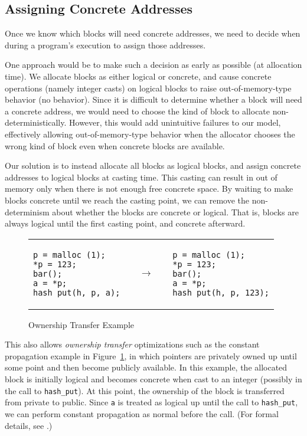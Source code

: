 \subsection{Assigning Concrete Addresses}
\label{idea:ownership}

Once we know which blocks will need concrete addresses, we need to
decide when during a program's execution to assign those addresses.

One approach would be to make such a decision as early as possible
(\ie at allocation time). We allocate blocks as either logical or
concrete, and cause concrete operations (namely integer casts) on
logical blocks to raise out-of-memory-type behavior (\ie no behavior).
Since it is difficult to determine whether a block will need a
concrete address,
we would need to choose the kind of block to allocate
non-deterministically. However, this would add unintuitive failures to
our model, effectively allowing out-of-memory-type behavior when the
allocator chooses the wrong kind of block even when concrete blocks
are available.

Our solution is to instead allocate all blocks as logical blocks, and assign concrete addresses to logical blocks at casting time. This casting can result in out of memory only when there is not enough free concrete space. By waiting to make blocks concrete until we reach the casting point,
we can remove the non-determinism about whether the blocks are
concrete or logical. That is, blocks are always logical until the
first casting point, and concrete afterward.

\begin{figure}[t]
\center
\begin{tabular}{lll}
\begin{lstlisting}
p = malloc (1);
*p = 123;
bar();
a = *p;
hash_put(h, p, a);
\end{lstlisting}
&
$\quad\rightarrow\quad$
&
\begin{lstlisting}
p = malloc (1);
*p = 123;
bar();
a = *p;
hash_put(h, p, 123);
\end{lstlisting}
\end{tabular}
\caption{Ownership Transfer Example}\label{code:ownership}
\end{figure}

This also allows \emph{ownership transfer} optimizations such as the
constant propagation example in Figure~\ref{code:ownership}, in which
pointers are privately owned up until some point and then become
publicly available.  
In this example,
the allocated block is initially logical and becomes concrete when cast to an
integer (possibly in the call to \texttt{hash\_put}). At this point, the ownership of the block is transferred from
private to public. Since \texttt{a} is treated as logical up until the
call to \texttt{hash\_put}, we can perform constant propagation as
normal before the call. (For formal details, see .)

